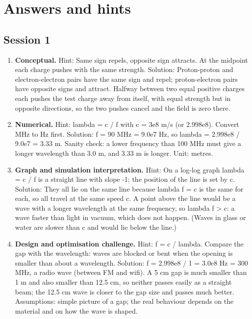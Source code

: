 \documentclass[11pt,a4paper]{article}
\begin{document}
\section{Answers and hints}

\subsection*{Session 1}
\begin{enumerate}[nosep]
\item \textbf{Conceptual.} Hint: Same sign repels, opposite sign attracts. At the midpoint each charge pushes with the same strength. Solution: Proton-proton and electron-electron pairs have the same sign and repel; proton-electron pairs have opposite signs and attract. Halfway between two equal positive charges each pushes the test charge away from itself, with equal strength but in opposite directions, so the two pushes cancel and the field is zero there.
\item \textbf{Numerical.} Hint: lambda = c / f with c = 3e8 m/s (or 2.998e8). Convert MHz to Hz first. Solution: f = 90 MHz = 9.0e7 Hz, so lambda = 2.998e8 / 9.0e7 = 3.33 m. Sanity check: a lower frequency than 100 MHz must give a longer wavelength than 3.0 m, and 3.33 m is longer. Unit: metres.
\item \textbf{Graph and simulation interpretation.} Hint: On a log-log graph lambda = c / f is a straight line with slope -1; the position of the line is set by c. Solution: They all lie on the same line because lambda f = c is the same for each, so all travel at the same speed c. A point above the line would be a wave with a longer wavelength at the same frequency, so lambda f \textgreater{} c: a wave faster than light in vacuum, which does not happen. (Waves in glass or water are slower than c and would lie below the line.)
\item \textbf{Design and optimisation challenge.} Hint: f = c / lambda. Compare the gap with the wavelength: waves are blocked or bent when the opening is smaller than about a wavelength. Solution: f = 2.998e8 / 1 = 3.0e8 Hz = 300 MHz, a radio wave (between FM and wifi). A 5 cm gap is much smaller than 1 m and also smaller than 12.5 cm, so neither passes easily as a straight beam; the 12.5 cm wave is closer to the gap size and passes much better. Assumptions: simple picture of a gap; the real behaviour depends on the material and on how the wave is shaped.
\end{enumerate}
\end{document}
